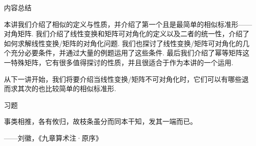 \vspace{2ex}
\centerline{\heiti \Large 内容总结}

本讲我们介绍了相似的定义与性质，并介绍了第一个且是最简单的相似标准形——对角矩阵. 我们介绍了线性变换和矩阵可对角化的定义以及二者的统一性，介绍了如何求解线性变换/矩阵的对角化问题. 我们也探讨了线性变换/矩阵可对角化的几个充分必要条件，并通过大量的例题运用了这些条件. 最后我们介绍了幂等矩阵这一特殊矩阵，它有很多值得探讨的性质，并且很适合于作为本讲的一个运用.

从下一讲开始，我们将要介绍当线性变换/矩阵不可对角化时，它们可以有哪些退而求其次的也比较简单的相似标准形.

\vspace{2ex}
\centerline{\heiti \Large 习题}

\vspace{2ex}
{\kaishu 事类相推，各有攸归，故枝条虽分而同本干知，发其一端而已。}
\begin{flushright}
    \kaishu
    ——刘徽，《九章算术注·原序》
\end{flushright}

